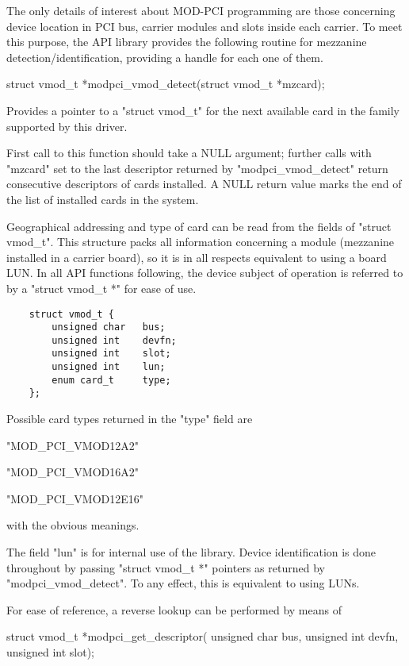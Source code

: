 \documentclass[11pt,a4paper]{article}
\begin{document}
The only details of interest about MOD-PCI programming are those
concerning device location in PCI bus, carrier modules and slots
inside each carrier. To meet this purpose, the API library 
provides the following routine for mezzanine detection/identification,
providing a handle for each one of them.

\begin{proto}
struct vmod_t *modpci_vmod_detect(struct vmod_t *mzcard);
\end{proto}

Provides a pointer to a "struct vmod_t" for the next available card
in the family supported by this driver. 

First call to this function
should take a NULL argument; further calls with "mzcard" set 
to the last  descriptor returned by "modpci_vmod_detect" return 
consecutive descriptors of cards installed. 
A NULL return value marks the end
of the list of installed cards in the system. 

Geographical addressing and type
of card can be read from the fields of "struct vmod_t". This
structure packs all information concerning a module (mezzanine
installed in a carrier board), so it is in all respects equivalent
to using a board LUN. In all API functions following, 
the device subject of operation is referred to by a "struct vmod_t *"
for ease of use.

\begin{Verbatim}
	struct vmod_t {
		unsigned char   bus;
		unsigned int    devfn;
		unsigned int	slot;
		unsigned int    lun;
		enum card_t     type;
	};
\end{Verbatim}

Possible card types returned in the "type" field are 
\begin{compactitem}
   \item "MOD_PCI_VMOD12A2" 
   \item "MOD_PCI_VMOD16A2"
   \item "MOD_PCI_VMOD12E16"
\end{compactitem}
with the obvious meanings.

The field "lun" is for internal use of the library. Device
identification is done throughout by passing
"struct vmod_t *" pointers as returned by "modpci_vmod_detect".
To any effect, this is equivalent to using LUNs.

For ease of reference, a reverse lookup can be performed by means of

\begin{proto}
struct vmod_t *modpci_get_descriptor(
	unsigned char bus, 
	unsigned int devfn, 
	unsigned int slot);
\end{proto}
\end{document}
